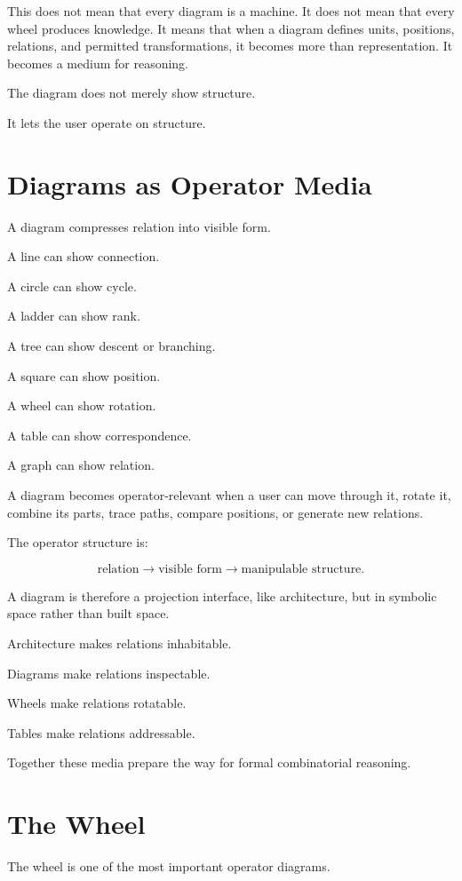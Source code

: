 \documentclass[11pt]{book}
\begin{document}
This does not mean that every diagram is a machine. It does not mean that every wheel produces knowledge. It means that when a diagram defines units, positions, relations, and permitted transformations, it becomes more than representation. It becomes a medium for reasoning.

The diagram does not merely show structure.

It lets the user operate on structure.

\section{Diagrams as Operator Media}

A diagram compresses relation into visible form.

A line can show connection.

A circle can show cycle.

A ladder can show rank.

A tree can show descent or branching.

A square can show position.

A wheel can show rotation.

A table can show correspondence.

A graph can show relation.

A diagram becomes operator-relevant when a user can move through it, rotate it, combine its parts, trace paths, compare positions, or generate new relations.

The operator structure is:

\[
\text{relation}
\rightarrow
\text{visible form}
\rightarrow
\text{manipulable structure}.
\]

A diagram is therefore a projection interface, like architecture, but in symbolic space rather than built space.

Architecture makes relations inhabitable.

Diagrams make relations inspectable.

Wheels make relations rotatable.

Tables make relations addressable.

Together these media prepare the way for formal combinatorial reasoning.

\section{The Wheel}

The wheel is one of the most important operator diagrams.
\end{document}
